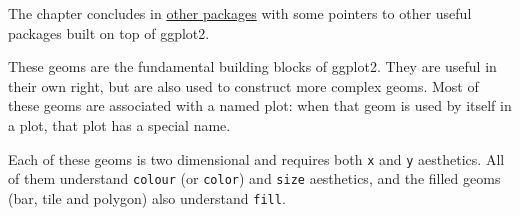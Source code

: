 The chapter concludes in \hyperref[sec:elsewhere]{other packages} with
some pointers to other useful packages built on top of ggplot2.


These geoms are the fundamental building blocks of ggplot2. They are
useful in their own right, but are also used to construct more complex
geoms. Most of these geoms are associated with a named plot: when that
geom is used by itself in a plot, that plot has a special name.

Each of these geoms is two dimensional and requires both \texttt{x} and
\texttt{y} aesthetics. All of them understand \texttt{colour} (or
\texttt{color}) and \texttt{size} aesthetics, and the filled geoms (bar,
tile and polygon) also understand \texttt{fill}.

